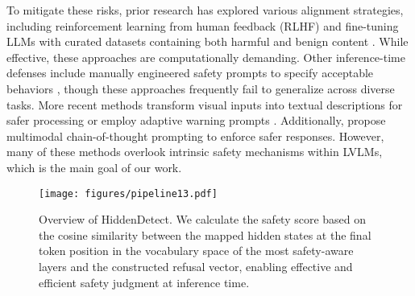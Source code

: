 To mitigate these risks, prior research has explored various alignment strategies, including reinforcement learning from human feedback (RLHF) \cite{chen2023dress} and fine-tuning LLMs with curated datasets containing both harmful and benign content \cite{MLLM_protector, du2024vlmguarddefendingvlmsmalicious}. While effective, these approaches are computationally demanding. Other inference-time defenses include manually engineered safety prompts to specify acceptable behaviors \cite{wu2023jailbreaking}, though these approaches frequently fail to generalize across diverse tasks. More recent methods transform visual inputs into textual descriptions for safer processing \cite{gou2024eyes} or employ adaptive warning prompts \cite{wang2024adashield}. Additionally, \citet{jiang2024rapguardsafeguardingmultimodallarge} propose multimodal chain-of-thought prompting to enforce safer responses. However, many of these methods overlook intrinsic safety mechanisms within LVLMs, which is the main goal of our work.

\begin{figure*}[!t]   
\centering
        \texttt{[image: figures/pipeline13.pdf]}
        \caption{Overview of HiddenDetect. We calculate the safety score based on the cosine similarity between the mapped hidden states at the final token position in the vocabulary space of the most safety-aware layers and the constructed refusal vector, enabling effective and efficient safety judgment at inference time.}   
        \label{pipeline}
\end{figure*}